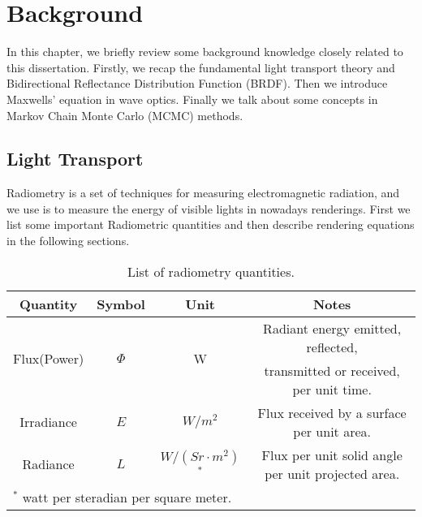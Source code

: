 \chapter{Background}
\label{cpt:background}

In this chapter, we briefly review some background knowledge closely related to this dissertation. Firstly, we recap the fundamental light transport theory and Bidirectional Reflectance Distribution Function (BRDF). Then we introduce Maxwells' equation in wave optics. Finally we talk about some concepts in Markov Chain Monte Carlo (MCMC) methods. 

\section{Light Transport}
Radiometry is a set of techniques for measuring electromagnetic radiation, and we use is to measure the energy of visible lights in nowadays renderings. First we list some important Radiometric quantities and then describe rendering equations in the following sections.

\begin{table}[h]
	\centering
	\caption[List of radiometry quantities]{\label{tab:background:notation}
		List of radiometry quantities.
	}
	\begin{tabular}{cccc}
		Quantity & Symbol & Unit & Notes \\
		\hline
		\multirow{2}{*}{Flux(Power)} & \multirow{2}{*}{$\Phi$} & \multirow{2}{*}{W} & Radiant energy emitted, reflected, \\
		 & & & transmitted or received, per unit time. \\[0.2em]
		Irradiance & $E$ & $W/m^2$ & Flux received by a surface per unit area. \\[0.2em]
		Radiance & $L$ & $W/(Sr\cdot m^2)$ $^*$ & Flux per unit solid angle per unit projected area. \\
		\hline
		\multicolumn{3}{l}{\footnotesize{$^*$ watt per steradian per square meter.}}	
	\end{tabular}
\end{table}

